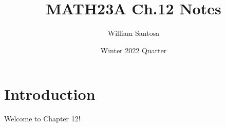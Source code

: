 \documentclass[12pt, letterpaper]{article}
\title{MATH23A Ch.12 Notes}
\author{William Santosa}
\date{Winter 2022 Quarter}
\begin{document}
\maketitle

\section{Introduction}

Welcome to Chapter 12!
\end{document}
